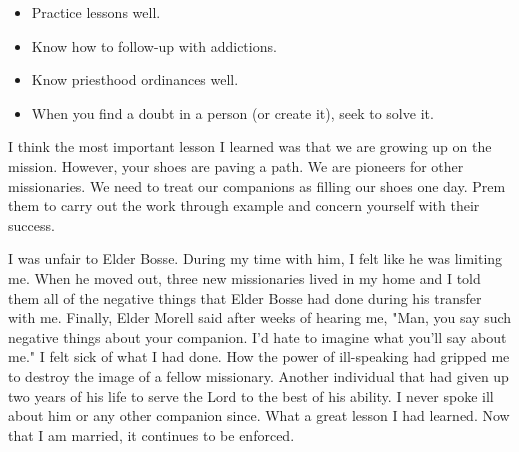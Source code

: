 \begin{entry}
{\begin{enumerate}
\begin{itemize}
	\item Practice lessons well.
	\item Know how to follow-up with addictions.
	\item Know priesthood ordinances well.
	\item When you find a doubt in a person (or create it), seek to solve it.
	\end{itemize}
\end{enumerate}
I think the most important lesson I learned was that we are growing up on the mission.  However, your shoes are paving a path.  We are pioneers for other missionaries.  We need to treat our companions as filling our shoes one day.  Prem them to carry out the work through example and concern yourself with their success.
}
{I was unfair to Elder Bosse. During my time with him, I felt like he was limiting me.  When he moved out, three new missionaries lived in my home and I told them all of the negative things that Elder Bosse had done during his transfer with me.  Finally, Elder Morell said after weeks of hearing me, "Man, you say such negative things about your companion.  I'd hate to imagine what you'll say about me." I felt sick of what I had done.  How the power of ill-speaking had gripped me to destroy the image of a fellow missionary.  Another individual that had given up two years of his life to serve the Lord to the best of his ability.  I never spoke ill about him or any other companion since.  What a great lesson I had learned.  Now that I am married, it continues to be enforced. }
\end{entry}

